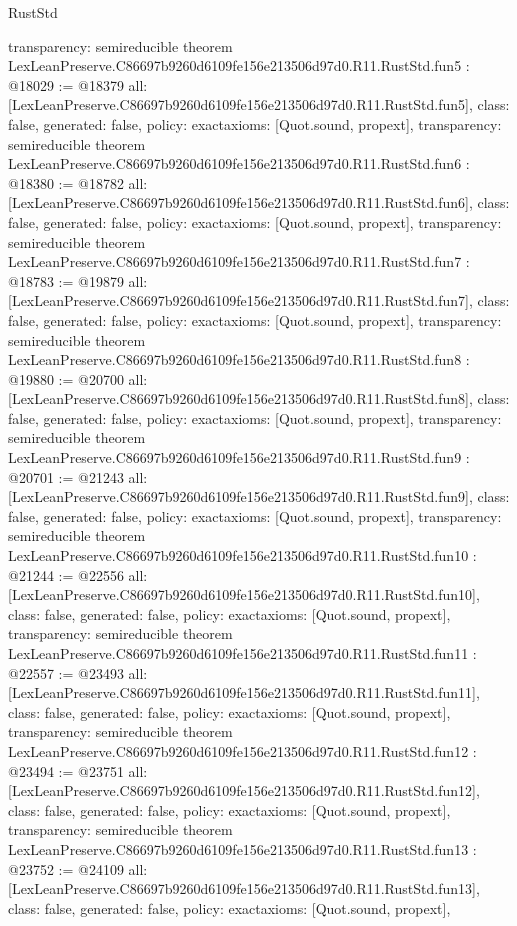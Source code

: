 \begin{lexlean}{RustStd}
\begin{coremodule}
{  transparency: semireducible
}
theorem LexLeanPreserve.C86697b9260d6109fe156e213506d97d0.R11.RustStd.fun5 : @18029 := @18379 {
  all: [LexLeanPreserve.C86697b9260d6109fe156e213506d97d0.R11.RustStd.fun5],
  class: false,
  generated: false,
  policy: exact{axioms: [Quot.sound, propext]},
  transparency: semireducible
}
theorem LexLeanPreserve.C86697b9260d6109fe156e213506d97d0.R11.RustStd.fun6 : @18380 := @18782 {
  all: [LexLeanPreserve.C86697b9260d6109fe156e213506d97d0.R11.RustStd.fun6],
  class: false,
  generated: false,
  policy: exact{axioms: [Quot.sound, propext]},
  transparency: semireducible
}
theorem LexLeanPreserve.C86697b9260d6109fe156e213506d97d0.R11.RustStd.fun7 : @18783 := @19879 {
  all: [LexLeanPreserve.C86697b9260d6109fe156e213506d97d0.R11.RustStd.fun7],
  class: false,
  generated: false,
  policy: exact{axioms: [Quot.sound, propext]},
  transparency: semireducible
}
theorem LexLeanPreserve.C86697b9260d6109fe156e213506d97d0.R11.RustStd.fun8 : @19880 := @20700 {
  all: [LexLeanPreserve.C86697b9260d6109fe156e213506d97d0.R11.RustStd.fun8],
  class: false,
  generated: false,
  policy: exact{axioms: [Quot.sound, propext]},
  transparency: semireducible
}
theorem LexLeanPreserve.C86697b9260d6109fe156e213506d97d0.R11.RustStd.fun9 : @20701 := @21243 {
  all: [LexLeanPreserve.C86697b9260d6109fe156e213506d97d0.R11.RustStd.fun9],
  class: false,
  generated: false,
  policy: exact{axioms: [Quot.sound, propext]},
  transparency: semireducible
}
theorem LexLeanPreserve.C86697b9260d6109fe156e213506d97d0.R11.RustStd.fun10 : @21244 := @22556 {
  all: [LexLeanPreserve.C86697b9260d6109fe156e213506d97d0.R11.RustStd.fun10],
  class: false,
  generated: false,
  policy: exact{axioms: [Quot.sound, propext]},
  transparency: semireducible
}
theorem LexLeanPreserve.C86697b9260d6109fe156e213506d97d0.R11.RustStd.fun11 : @22557 := @23493 {
  all: [LexLeanPreserve.C86697b9260d6109fe156e213506d97d0.R11.RustStd.fun11],
  class: false,
  generated: false,
  policy: exact{axioms: [Quot.sound, propext]},
  transparency: semireducible
}
theorem LexLeanPreserve.C86697b9260d6109fe156e213506d97d0.R11.RustStd.fun12 : @23494 := @23751 {
  all: [LexLeanPreserve.C86697b9260d6109fe156e213506d97d0.R11.RustStd.fun12],
  class: false,
  generated: false,
  policy: exact{axioms: [Quot.sound, propext]},
  transparency: semireducible
}
theorem LexLeanPreserve.C86697b9260d6109fe156e213506d97d0.R11.RustStd.fun13 : @23752 := @24109 {
  all: [LexLeanPreserve.C86697b9260d6109fe156e213506d97d0.R11.RustStd.fun13],
  class: false,
  generated: false,
  policy: exact{axioms: [Quot.sound, propext]},
}
\end{coremodule}
\end{lexlean}
